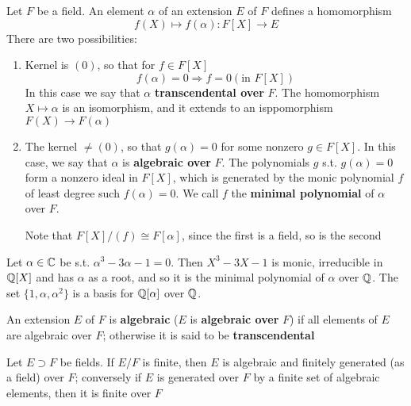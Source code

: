 \documentclass[11pt]{article}
\begin{document}
Let \(F\) be a field. An element \(\alpha\) of an extension \(E\) of \(F\) defines a homomorphism
\begin{equation*}
f(X)\mapsto f(\alpha):F[X]\to E
\end{equation*}
There are two possibilities:
\begin{enumerate}
\item Kernel is \((0)\), so that for \(f\in F[X]\)
\begin{equation*}
f(\alpha)=0\Rightarrow f=0 (\text{in }F[X])
\end{equation*}
In this case we say that \(\alpha\) \textbf{transcendental over} \(F\). The homomorphism \(X\mapsto\alpha\) is an
isomorphism, and it extends to an isppomorphism \(F(X)\to F(\alpha)\)
\item The kernel \(\neq(0)\), so that \(g(\alpha)=0\) for some nonzero \(g\in F[X]\). In this case, we say
that \(\alpha\) is \textbf{algebraic over} \(F\).  The polynomials \(g\) s.t. \(g(\alpha)=0\) form a nonzero ideal
in \(F[X]\), which is generated by the monic polynomial \(f\) of least degree
such \(f(\alpha)=0\). We call \(f\) the \textbf{minimal polynomial} of \(\alpha\) over \(F\).

Note that \(F[X]/(f)\cong F[\alpha]\), since the first is a field, so is the second
\end{enumerate}


\begin{examplle}[]
Let \(\alpha\in\mathbb{C}\) be s.t. \(\alpha^3-3\alpha-1=0\). Then \(X^3-3X-1\) is monic, irreducible in \(\mathbb{Q}[X]\) and  has
\(\alpha\) as a root, and so it is the minimal polynomial of \(\alpha\) over \(\mathbb{Q}\). The set \(\{1,\alpha,\alpha^2\}\) is a
basis for \(\mathbb{Q}[\alpha]\) over \(\mathbb{Q}\).
\end{examplle}

An extension \(E\) of \(F\) is \textbf{algebraic} (\(E\) is \textbf{algebraic over} \(F\)) if all elements
of \(E\) are algebraic over \(F\); otherwise it is said to be \textbf{transcendental}

\begin{proposition}[]
Let \(E\supset F\) be fields. If \(E/F\) is finite, then \(E\) is algebraic and finitely generated (as
a field) over \(F\); conversely if \(E\) is generated over \(F\) by a finite set of algebraic
elements, then it is finite over \(F\)
\end{proposition}
\end{document}
